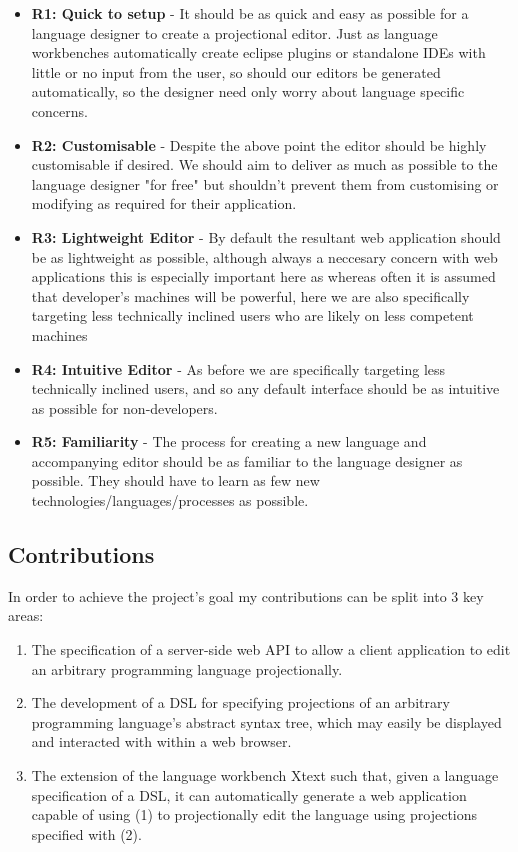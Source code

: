 \documentclass{report}
\begin{document}
\begin{itemize}
\item{\textbf{R1: Quick to setup} - It should be as quick and easy as possible for a language designer to create a projectional editor. Just as language workbenches automatically create eclipse plugins or standalone IDEs with little or no input from the user, so should our editors be generated automatically, so the designer need only worry about language specific concerns.}
\item{\textbf{R2: Customisable} - Despite the above point the editor should be highly customisable if desired. We should aim to deliver as much as possible to the language designer "for free" but shouldn't prevent them from customising or modifying as required for their application. }
\item{\textbf{R3: Lightweight Editor} - By default the resultant web application should be as lightweight as possible, although always a neccesary concern with web applications this is especially important here as whereas often it is assumed that developer's machines will be powerful, here we are also specifically targeting less technically inclined users who are likely on less competent machines}
\item{\textbf{R4: Intuitive Editor} - As before we are specifically targeting less technically inclined users, and so any default interface should be as intuitive as possible for non-developers.}
\item{\textbf{R5: Familiarity} - The process for creating a new language and accompanying editor should be as familiar to the language designer as possible. They should have to learn as few new technologies/languages/processes as possible.}
\end{itemize}

\subsection{Contributions}

In order to achieve the project's goal my contributions can be split into 3 key areas:

\begin{enumerate}
\item The specification of a server-side web API to allow a client application to edit an arbitrary programming language projectionally.
\item The development of a DSL for specifying projections of an arbitrary programming language's abstract syntax tree, which may easily be displayed and interacted with within a web browser.
\item The extension of the language workbench Xtext such that, given a language specification of a DSL, it can automatically generate a web application capable of using (1) to projectionally edit the language using projections specified with (2).
\end{enumerate}
\end{document}
